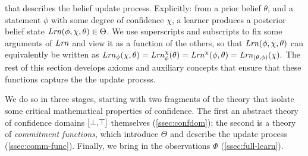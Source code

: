that describes the belief update process.
Explicitly: from a prior belief $\theta$, and a statement $\phi$
	with some degree of confidence $\chi$,
	a learner 
	produces a posterior belief state
	$\mathit{Lrn}(\phi,\chi,\theta) \in \Theta$.
We use superscripts and subscripts to
fix some arguments
of $\mathit{Lrn}$ and view it as a function of the others, so that
$\mathit{Lrn}(\phi,\chi,\theta)$
can equivalently be written as
$
	\mathit{Lrn}_\phi(\chi,\theta) = \mathit{Lrn}^\chi_\phi(\theta)
	= \mathit{Lrn}^\chi(\phi,\theta) = \mathit{Lrn}_{(\theta,\phi)}(\chi)
		 .
$
The rest of this section develops axioms and auxiliary concepts that ensure that these functions capture the the update procsss. 

We do so in three stages, starting with two fragments of the theory that isolate some critical mathematical properties of confidence. 
The first an abstract theory of confidence domains $[\bot,\!\top]$ themselves
	(\cref{ssec:confdom});
 	the second is a theory of \emph{commitment functions}, which introduce $\Theta$ and describe the update process (\cref{ssec:comm-func}). 
Finally, we bring in the observations $\Phi$ (\cref{ssec:full-learn}).


